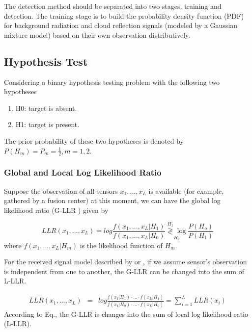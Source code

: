 The detection method should be separated into two stages, training
and detection. The training stage is to build the probability density
function (PDF) for background radiation and cloud reflection signals
(modeled by a Gaussian mixture model) based on their own observation
distributively.


\subsection{Hypothesis Test}

Considering a binary hypothesis testing problem with the following
two hypotheses
\begin{enumerate}
\item H0: target is absent.
\item H1: target is present.
\end{enumerate}
The prior probability of these two hypotheses is denoted by $P\left(H_{m}\right)=P_{m}=\frac{1}{2},m=1,2$.


\subsubsection{Global and Local Log Likelihood Ratio }

Suppose the observation of all sensors $x_{1},...,x_{L}$ is available
(for example, gathered by a fusion center) at this moment, we can
have the global log likelihood ratio (G-LLR ) given by

\begin{equation}
LLR(x_{1},...,x_{L})=log\frac{f\left(x_{1},...,x_{L}|H_{1}\right)}{f\left(x_{1},...,x_{L}|H_{0}\right)}\underset{H_{0}}{\overset{H_{1}}{\gtrless}\log}\frac{P\left(H_{o}\right)}{P\left(H_{1}\right)}\label{eq:G-LLR define Cloud}
\end{equation}
where $f\left(x_{1},...,x_{L}|H_{m}\right)$ is the likelihood function
of $H_{m}$. 

For the received signal model described by 
or , if we assume sensor\textquoteright{}s
observation is independent from one to another, the G-LLR can be changed
into the sum of L-LLR. 

\begin{eqnarray}
LLR(x_{1},...,x_{L}) & = & log\frac{f\left(x_{1}|H_{1}\right)\cdot\ldots\cdot f\left(x_{L}|H_{1}\right)}{f\left(x_{1}|H_{0}\right)\cdot\ldots\cdot f\left(x_{L}|H_{0}\right)}=\sum_{i=1}^{L}LLR\left(x_{i}\right)\label{eq:Sum L-LLR Cloud}
\end{eqnarray}
According to Eq., the G-LLR is changes into
the sum of local log likelihood ratio (L-LLR). 

